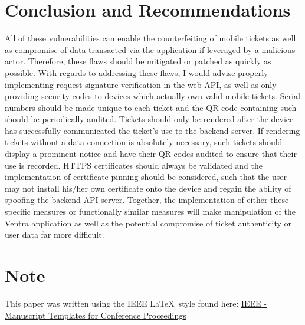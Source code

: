 \documentclass[12pt,conference]{IEEEtran}
\begin{document}
\section{Conclusion and Recommendations}
All of these vulnerabilities can enable the counterfeiting of mobile tickets as well as compromise of data transacted via the application if leveraged by a malicious actor. Therefore, these flaws should be mitigated or patched as quickly as possible. With regards to addressing these flaws, I would advise properly implementing request signature verification in the web API, as well as only providing security codes to devices which actually own valid mobile tickets. Serial numbers should be made unique to each ticket and the QR code containing such should be periodically audited. Tickets should only be rendered after the device has successfully communicated the ticket's use to the backend server. If rendering tickets without a data connection is absolutely necessary, such tickets should display a prominent notice and have their QR codes audited to ensure that their use is recorded. HTTPS certificates should always be validated and the implementation of certificate pinning should be considered, such that the user may not install his/her own certificate onto the device and regain the ability of spoofing the backend API server. Together, the implementation of either these specific measures or functionally similar measures will make manipulation of the Ventra application as well as the potential compromise of ticket authenticity or user data far more difficult.

\section*{Note}
This paper was written using the IEEE \LaTeX\ style found here: \href{http://www.ieee.org/conferences_events/conferences/publishing/templates.html}{IEEE - Manuscript Templates for Conference Proceedings}

\end{document}
